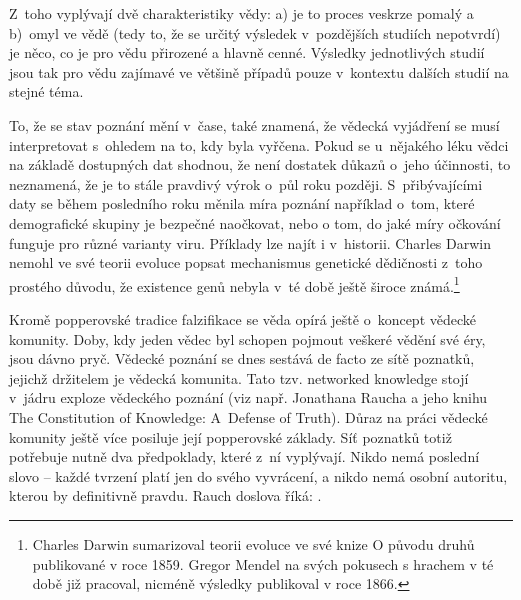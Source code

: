 Z~toho vyplývají dvě charakteristiky vědy: a) je to proces veskrze pomalý a b)~omyl ve vědě (tedy to, že se určitý výsledek v~pozdějších studiích nepotvrdí) je něco, co je pro vědu přirozené a hlavně cenné. Výsledky jednotlivých studií jsou tak pro vědu zajímavé ve většině případů pouze v~kontextu dalších studií na stejné téma.

To, že se stav poznání mění v~čase, také znamená, že vědecká vyjádření se musí interpretovat s~ohledem na to, kdy byla vyřčena. Pokud se u~nějakého léku vědci na základě dostupných dat shodnou, že není dostatek důkazů o~jeho účinnosti, to neznamená, že je to stále pravdivý výrok o~půl roku později. S~přibývajícími daty se během posledního roku měnila míra poznání například o~tom, které demografické skupiny je bezpečné naočkovat, nebo o tom, do jaké míry očkování funguje pro různé varianty viru. Příklady lze najít i v~historii. Charles Darwin nemohl ve své teorii evoluce popsat mechanismus genetické dědičnosti z~toho prostého důvodu, že existence genů nebyla v~té době ještě široce známá.\footnote{Charles Darwin sumarizoval teorii evoluce ve své knize O původu druhů publikované v roce 1859. Gregor Mendel na svých pokusech s hrachem v té době již pracoval, nicméně výsledky publikoval v roce 1866.}

Kromě popperovské tradice falzifikace se věda opírá ještě o~koncept vědecké komunity. Doby, kdy jeden vědec byl schopen pojmout veškeré vědění své éry, jsou dávno pryč. Vědecké poznání se dnes sestává de facto ze sítě poznatků, jejichž držitelem je vědecká komunita. Tato tzv. networked knowledge stojí v~jádru exploze vědeckého poznání (viz např. Jonathana Raucha a jeho knihu The Constitution of Knowledge: A~Defense of Truth). Důraz na práci vědecké komunity ještě více posiluje její popperovské základy. Síť poznatků totiž potřebuje nutně dva předpoklady, které z~ní vyplývají. Nikdo nemá poslední slovo -- každé tvrzení platí jen do svého vyvrácení, a nikdo nemá osobní autoritu, kterou by definitivně  pravdu. Rauch doslova říká:  \cite{Rauch2021}.

